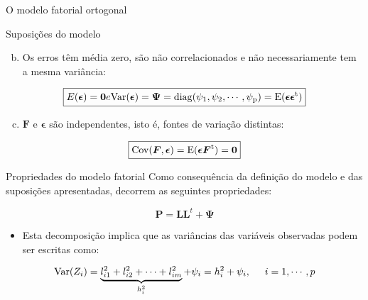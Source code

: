 \documentclass[
  ignorenonframetext,
  aspectratio=169,
]{beamer}
\providecommand{\tightlist}{%
  \setlength{\itemsep}{0pt}\setlength{\parskip}{0pt}}
\begin{document}
\begin{frame}{O modelo fatorial ortogonal}
\label{o-modelo-fatorial-ortogonal-3}
\begin{block}{Suposições do modelo}
\label{suposiuxe7uxf5es-do-modelo-1}
\begin{enumerate}
[a)]
\setcounter{enumi}{1}
\tightlist
\item
  Os erros têm média zero, são não correlacionados e não necessariamente
  tem a mesma variância:
\end{enumerate}

\[\boxed{E({\boldsymbol{\epsilon}}) = \boldsymbol{0} e  \rm{Var}({\boldsymbol{\epsilon}}) = \boldsymbol{\Psi} = \rm{diag}(\psi_1, \psi_2, \cdots, \psi_p)
= E({\boldsymbol{\epsilon}}{\boldsymbol{\epsilon}}^t)
}\]

\begin{enumerate}
[a)]
\setcounter{enumi}{2}
\tightlist
\item
  \({\boldsymbol{F}}\) e \({\boldsymbol{\epsilon}}\) são independentes,
  isto é, fontes de variação distintas:
\end{enumerate}

\[\boxed{\rm{Cov}({\boldsymbol{F}},{\boldsymbol{\epsilon}}) = E({\boldsymbol{\epsilon}}{\boldsymbol{F}}^t) = \boldsymbol{0}}\]
\end{block}
\end{frame}

\begin{frame}{Propriedades do modelo fatorial}
\label{propriedades-do-modelo-fatorial}
Como consequência da definição do modelo e das suposições apresentadas,
decorrem as seguintes propriedades:

\[\boldsymbol{P} = \boldsymbol{L}\boldsymbol{L}^t + \boldsymbol{\Psi}\]

\pause

\begin{itemize}
\tightlist
\item
  Esta decomposição implica que as variâncias das variáveis observadas
  podem ser escritas como:
\end{itemize}

\[\text{Var}(Z_i) = \underbrace{l_{i1}^2 + l_{i2}^2 + \cdots + l_{im}^2}_{h_i^2} + \psi_i = h_i^2 + \psi_i, \hspace{0.5cm} i = 1, \cdots, p\]
\end{frame}
\end{document}
